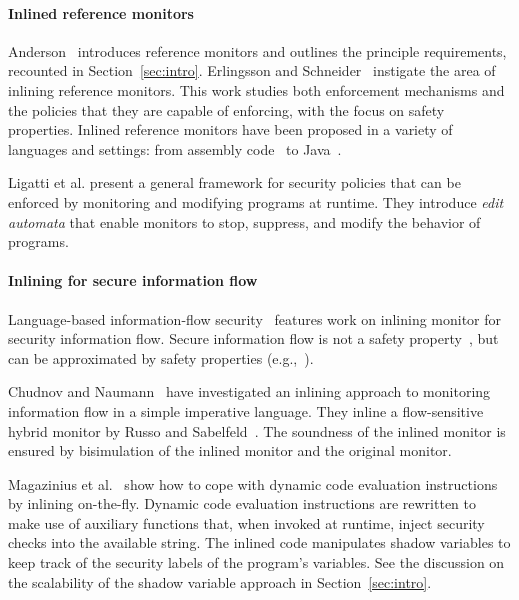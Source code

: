 \documentclass{llncs}
\begin{document}
\paragraph{Inlined reference monitors}
Anderson~\cite{Anderson:72} introduces reference monitors and
outlines the principle requirements, recounted in Section~\ref{sec:intro}.
%
Erlingsson and Schneider~\cite{DBLP:conf/nspw/ErlingssonS99,Erlingsson:PhD04} instigate
the area of inlining reference monitors. 
This work studies both enforcement mechanisms and the policies
that they are capable of enforcing, with the focus on safety properties.
Inlined reference monitors
have been proposed in a variety of languages and settings: from
assembly code~\cite{DBLP:conf/nspw/ErlingssonS99} to Java~\cite{DBLP:conf/ecoop/DamJLP09,DBLP:journals/jcs/DamJLP10,DBLP:conf/ccs/DamGL12}.

Ligatti et al. \cite{Ligatti05editautomata:} present a 
general framework for security policies that can
be enforced by monitoring and modifying programs at runtime. 
They introduce \emph{edit automata} that enable
monitors to stop, suppress, and modify the behavior of programs. 



\paragraph{Inlining for secure information flow}
Language-based information-flow security~\cite{Sabelfeld:Myers:JSAC}
features work on inlining monitor for security information flow.
Secure information flow is not
a safety property~\cite{McLean:SSP94}, but can be approximated by
safety properties
(e.g.,~\cite{Boudol:FAST08,Sabelfeld:Russo:PSI09,Austin:Flanagan:PLAS09}).

Chudnov and
Naumann~\cite{Chudnov:Naumann:CSF10} have investigated an inlining
approach to monitoring information flow in a simple imperative language. They inline a flow-sensitive
hybrid monitor by Russo and
Sabelfeld~\cite{Russo:Sabelfeld:CSF10}. The soundness of the inlined
monitor is ensured by bisimulation of the inlined monitor and the
original monitor.

Magazinius et
al.~\cite{Magazinius+:SEC10,DBLP:journals/compsec/MagaziniusRS12} show
how to cope with dynamic code evaluation instructions by inlining
on-the-fly. 
Dynamic code evaluation instructions are
rewritten to make use of auxiliary functions that, when invoked at
runtime, inject security checks into the available string. 
The inlined code manipulates shadow variables to keep track of the
security labels of the program's variables.
See the discussion on the scalability of the shadow variable approach
in Section~\ref{sec:intro}.
\end{document}
